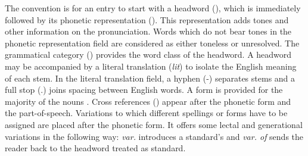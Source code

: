 \begin{table}
\caption[]{Illustrations of dictionary entries\label{tab:illu-dict}}
 \begin{center}
\end{center}
\end{table}

The convention is for an entry to start with a  headword (), which is immediately followed by its phonetic representation (). This representation adds tones and other information on the pronunciation. Words which do not bear tones in the phonetic representation field are considered as either toneless or  unresolved. The grammatical category () provides  the word class of the headword. A headword may be accompanied by a literal translation ({\it lit})  to isolate the English meaning of each stem.  In the literal translation field, a hyphen (-) separates stems and a full stop (.) joins spacing between English words. A  form  is provided for the majority of the nouns . Cross references  () appear after  the phonetic form and the part-of-speech. Variations to which different spellings or forms have to be assigned are placed after the phonetic form. It offers some lectal and generational variations in the following way: {\it var.} introduces a standard's  and  {\it var. of} sends the reader back to the headword treated as standard. 


